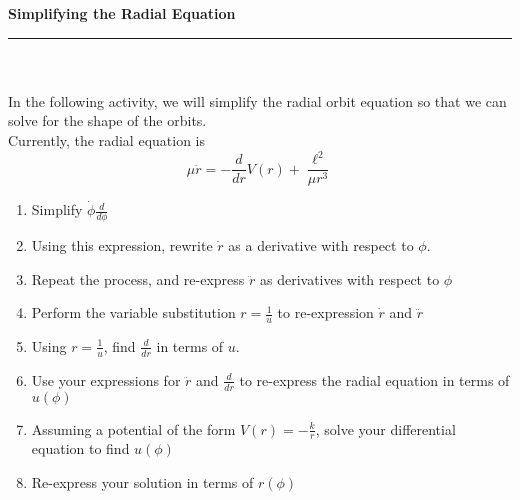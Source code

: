 \documentclass[a4paper, 11pt]{article}
\begin{document}
\noindent
\begin{center}
  \centering
  \huge\textbf{Simplifying the Radial Equation} 
\end{center}
\par\noindent\rule{\textwidth}{0.4pt} \\\\


\noindent In the following activity, we will simplify the radial orbit equation
so that we can solve for the shape of the orbits.\\

\noindent Currently, the radial equation is
\begin{equation}
  \mu \ddot{r} = -\frac{d}{dr}V(r) + \frac{\ell^2}{\mu r^3}
\end{equation}


\begin{enumerate}[leftmargin=0em, label=\textbf{\arabic*}.]
\item Simplify $\dot{\phi}\frac{d}{d\phi}$
  \vspace{10em}
\item Using this expression, rewrite $\dot{r}$ as a derivative with respect
  to $\phi$.
  \vspace{10em}
\item Repeat the process, and re-express $\ddot{r}$ as derivatives with
  respect to $\phi$
  \vspace{10em}
\item Perform the variable substitution $r =\frac{1}{u}$ to re-expression $\dot{r}$ and $\ddot{r}$
  \vspace{10em}
\item Using $r=\frac{1}{u}$, find $\frac{d}{dr}$ in terms of $u$.
  \vspace{7em}
\item Use your expressions for $\ddot{r}$ and $\frac{d}{dr}$ to re-express the
  radial equation in terms of $u(\phi)$
  \vspace{10em}
\item Assuming a potential of the form $V(r)= -\frac{k}{r}$, solve your
  differential equation to find $u(\phi)$
  \vspace{20em}
\item Re-express your solution in terms of $r(\phi)$
  
  
  
  
\end{enumerate}




 
\end{document}
